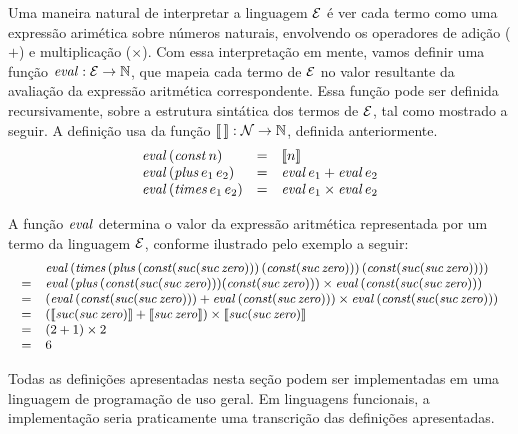 \begin{Definition}\label{def:sem:Exp}
Uma maneira natural de interpretar a linguagem $\mathcal{E}$ é ver cada termo como uma  expressão arimética sobre números naturais, envolvendo os operadores de adição ($+$) e multiplicação ($\times$). Com essa interpretação em mente, vamos definir uma função $\textit{eval\/} : \mathcal{E} \rightarrow \mathbb{N}$, que mapeia cada termo de $\mathcal{E}$ no valor resultante da avaliação da expressão aritmética correspondente. Essa função pode ser definida recursivamente, sobre a estrutura sintática dos termos de $\mathcal{E}$, tal como mostrado a seguir. A definição usa da função  $\llbracket\,\rrbracket : \mathcal{N} \rightarrow \mathbb{N}$, definida anteriormente.
\[
\begin{array}{lcl}
\textit{eval\/}\, (\textit{const\/}\, n)  & = & \llbracket n \rrbracket \\
\textit{eval\/}\, (\textit{plus\/}\,e_1\,e_2) & = & \textit{eval\/}\,e_1 + \textit{eval\/}\,e_2 \\
\textit{eval\/}\, (\textit{times\/}\,e_1\,e_2) & = & \textit{eval\/}\,e_1 \times \textit{eval\/}\,e_2 \\
\end{array}
\]
\end{Definition}
A função $\textit{eval\/}$ determina o valor da expressão aritmética representada por um termo da linguagem $\mathcal{E}$, conforme ilustrado pelo exemplo a seguir:
\[ \small{
\begin{array}{ll}
&\textit{eval\/}\, (\textit{times\/}\,(\textit{plus\/}\,(\textit{const\/}(\textit{suc\/}(\textit{suc\/}\,\textit{zero\/})))\, (\textit{const\/}(\textit{suc\/}\,\textit{zero\/})))\, (\textit{const\/}(\textit{suc\/}(\textit{suc\/}\,\textit{zero\/})))) \\
= & \textit{eval\/}\, (\textit{plus\/}\,(\textit{const\/}(\textit{suc\/}(\textit{suc\/}\,\textit{zero\/}))) (\textit{const\/}(\textit{suc\/}\,\textit{zero\/}))) \times \textit{eval\/}\, (\textit{const\/}(\textit{suc\/}(\textit{suc\/}\, \textit{zero\/})))  \\
=  & (\textit{eval\/}\, (\textit{const\/}(\textit{suc\/}(\textit{suc\/}\,\textit{zero\/}))) + \textit{eval\/}\,  (\textit{const\/}(\textit{suc\/}\,\textit{zero\/}))) \times \textit{eval\/}\, (\textit{const\/}(\textit{suc\/}(\textit{suc\/}\, \textit{zero\/}))) \\
=  & (\llbracket \textit{suc\/}(\textit{suc\/}\,\textit{zero\/}) \rrbracket + \llbracket  \textit{suc\/}\,\textit{zero\/}\rrbracket) \times \llbracket \textit{suc\/}(\textit{suc\/}\,\textit{zero\/}) \rrbracket \\
=  & (2 + 1) \times 2 \\
= & 6
\end{array}}
\]

Todas as defini\c{c}\~oes apresentadas nesta se\c{c}\~ao podem ser implementadas em uma linguagem de programação de uso geral. Em linguagens funcionais, a implementação seria praticamente uma transcrição das definições apresentadas.

